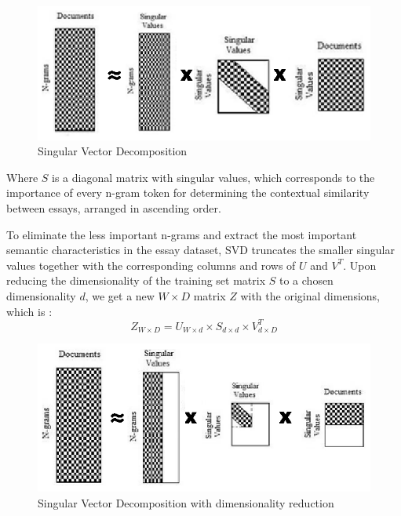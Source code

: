 \documentclass[10pt,letterpaper]{article}
\begin{document}
\begin{figure}[H]
\begin{center}
\includegraphics[width=\linewidth]{img/SVD.eps}
\end{center}
\caption{Singular Vector Decomposition \cite{islam2010automated}} 
\end{figure}

Where $S$ is a diagonal matrix with singular values, which corresponds to the importance of every n-gram token for determining the contextual similarity between essays, arranged in ascending order.

To eliminate the less important n-grams and extract the most important semantic characteristics in the essay dataset, SVD truncates the smaller singular values together with the corresponding columns and rows of $U$ and $V^T$. Upon reducing the dimensionality of the training set matrix $S$ to a chosen dimensionality $d$, we get a new $W \times D$ matrix $Z$ with the original dimensions, which is \cite{islam2010automated}:
$$Z_{W\times D} = U_{W\times d} \times S_{d \times d} \times V^{T}_{d \times D}$$

\begin{figure}[H]
\begin{center}
\includegraphics[width=\linewidth]{img/SVDReduced.eps}
\end{center}
\caption{Singular Vector Decomposition with dimensionality reduction \cite{islam2010automated}} 
\end{figure}
\end{document}
